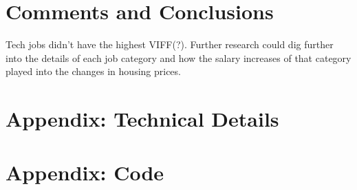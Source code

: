\documentclass{article}
\begin{document}
\section{Comments and Conclusions}
Tech jobs didn't have the highest VIFF(?).
Further research could dig further into the details of each job category and how the salary increases of that category played into the changes in housing prices.

\appendix
\section{Appendix: Technical Details}



\section{Appendix: Code}
\end{document}
